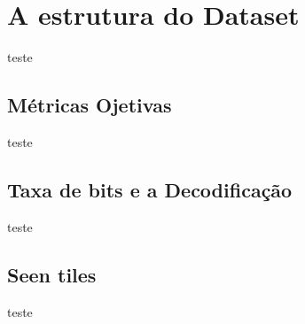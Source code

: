 \section{A estrutura do Dataset}
teste

\subsection{Métricas Ojetivas}

teste

\subsection{Taxa de bits e a Decodificação}

teste

\subsection{Seen tiles}

teste
